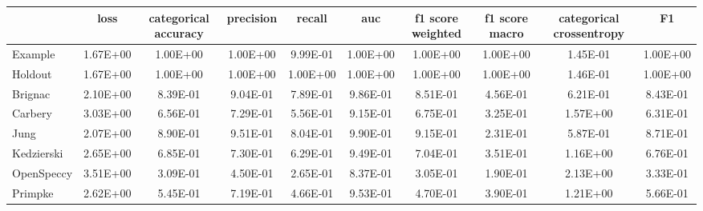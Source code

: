 \begin{tabular}{lccccccccc}
\toprule
 & loss & categorical accuracy & precision & recall & auc & f1 score weighted & f1 score macro & categorical crossentropy & F1 \\
\midrule
Example & 1.67E+00 & 1.00E+00 & 1.00E+00 & 9.99E-01 & 1.00E+00 & 1.00E+00 & 1.00E+00 & 1.45E-01 & 1.00E+00 \\
Holdout & 1.67E+00 & 1.00E+00 & 1.00E+00 & 1.00E+00 & 1.00E+00 & 1.00E+00 & 1.00E+00 & 1.46E-01 & 1.00E+00 \\
Brignac & 2.10E+00 & 8.39E-01 & 9.04E-01 & 7.89E-01 & 9.86E-01 & 8.51E-01 & 4.56E-01 & 6.21E-01 & 8.43E-01 \\
Carbery & 3.03E+00 & 6.56E-01 & 7.29E-01 & 5.56E-01 & 9.15E-01 & 6.75E-01 & 3.25E-01 & 1.57E+00 & 6.31E-01 \\
Jung & 2.07E+00 & 8.90E-01 & 9.51E-01 & 8.04E-01 & 9.90E-01 & 9.15E-01 & 2.31E-01 & 5.87E-01 & 8.71E-01 \\
Kedzierski & 2.65E+00 & 6.85E-01 & 7.30E-01 & 6.29E-01 & 9.49E-01 & 7.04E-01 & 3.51E-01 & 1.16E+00 & 6.76E-01 \\
OpenSpeccy & 3.51E+00 & 3.09E-01 & 4.50E-01 & 2.65E-01 & 8.37E-01 & 3.05E-01 & 1.90E-01 & 2.13E+00 & 3.33E-01 \\
Primpke & 2.62E+00 & 5.45E-01 & 7.19E-01 & 4.66E-01 & 9.53E-01 & 4.70E-01 & 3.90E-01 & 1.21E+00 & 5.66E-01 \\
\bottomrule
\end{tabular}
